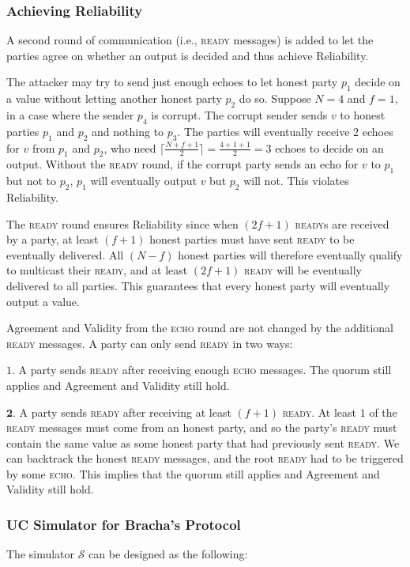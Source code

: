 \subsubsection{Achieving Reliability}
A second round of communication (i.e., \textsc{ready} messages) is added to let the parties agree on whether an output is decided and thus achieve Reliability.

The attacker may try to send just enough echoes to let honest party $p_1$ decide on a value without letting another honest party $p_2$ do so. Suppose $N=4$ and $f=1$, in a case where the sender $p_4$ is corrupt. The corrupt sender sends $v$ to honest parties $p_1$ and $p_2$ and nothing to $p_3$. The parties will eventually receive 2 echoes for $v$ from $p_1$ and $p_2$, who need $\lceil \frac{N+f+1}{2} \rceil = \frac{4+1+1}{2}=3$ echoes to decide on an output. Without the \textsc{ready} round, if the corrupt party sends an echo for $v$ to $p_1$ but not to $p_2$, $p_1$ will eventually output $v$ but $p_2$ will not. This violates Reliability.

The \textsc{ready} round ensures Reliability since when $(2f+1)$ \textsc{ready}s are received by a party, at least $(f+1)$ honest parties must have sent \textsc{ready} to be eventually delivered. All $(N-f)$ honest parties will therefore eventually qualify to multicast their \textsc{ready}, and at least $(2f+1)$ \textsc{ready} will be eventually delivered to all parties. This guarantees that every honest party will eventually output a value.

Agreement and Validity from the \textsc{echo} round are not changed by the additional \textsc{ready} messages. A party can only send \textsc{ready} in two ways:

$\mathbf{}{1}$. A party sends \textsc{ready} after receiving enough \textsc{echo} messages. The quorum still applies and Agreement and Validity still hold.

$\mathbf{2}$. A party sends \textsc{ready} after receiving at least $(f+1)$ \textsc{ready}. At least $1$ of the \textsc{ready} messages must come from an honest party, and so the party's \textsc{ready} must contain the same value as some honest party that had previously sent \textsc{ready}. We can backtrack the honest \textsc{ready} messages, and the root \textsc{ready} had to be triggered by some \textsc{echo}. This implies that the quorum still applies and Agreement and Validity still hold.

\subsubsection{UC Simulator for Bracha’s Protocol}
The simulator $\mathcal{S}$ can be designed as the following:

